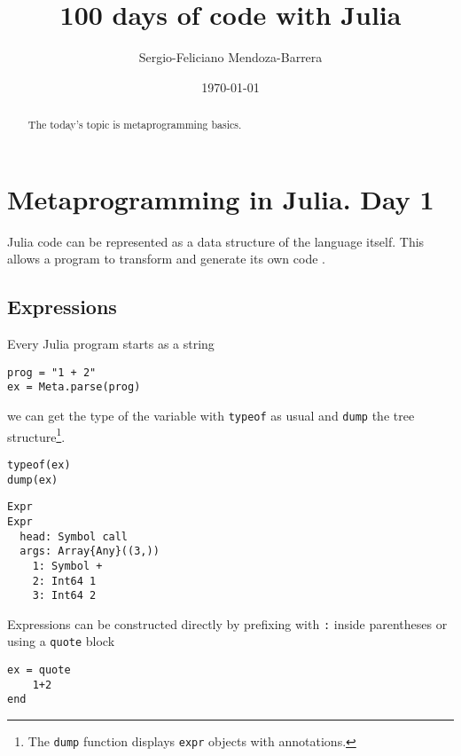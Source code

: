 \documentclass[letterpaper]{tufte-handout}
\author{Sergio-Feliciano Mendoza-Barrera}
\date{\today}
\title{100 days of code with Julia}
\begin{document}
\maketitle
\begin{abstract}
The today's topic is metaprogramming basics.
\end{abstract}

\section{Metaprogramming in Julia. Day 1}
\label{sec:org05ee56a}

Julia code can be represented as a data structure of the language
itself. This allows a program to transform and generate its own code
\citep[p. 204]{lauwens2020}.

\subsection{Expressions}
\label{sec:orgf3273b3}

Every Julia program starts as a string

\begin{verbatim}
prog = "1 + 2"
ex = Meta.parse(prog)
\end{verbatim}

we can get the type of the variable with \texttt{typeof} as usual and \texttt{dump}
the tree structure\footnote{The \texttt{dump} function displays \texttt{expr} objects
with annotations.}.

\begin{verbatim}
typeof(ex)
dump(ex)
\end{verbatim}

\begin{verbatim}
Expr
Expr
  head: Symbol call
  args: Array{Any}((3,))
    1: Symbol +
    2: Int64 1
    3: Int64 2
\end{verbatim}


\noindent Expressions can be constructed directly by prefixing with \texttt{:}
inside parentheses or using a \texttt{quote} block

\begin{verbatim}
ex = quote
    1+2
end
\end{verbatim}
\end{document}
